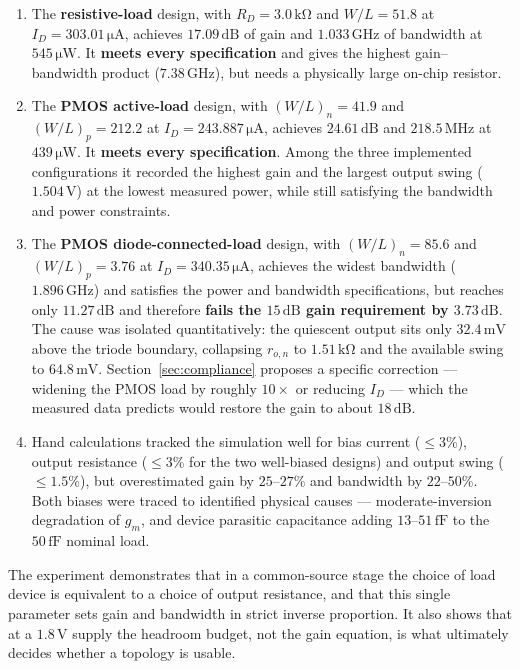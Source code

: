 \documentclass[12pt,a4paper]{article}
\newcommand{\U}[1]{\,\mathrm{#1}}
\begin{document}
\begin{enumerate}[leftmargin=2.2em,itemsep=3pt]

\item The \textbf{resistive-load} design, with $R_D = 3.0\U{k\Omega}$ and
$W/L = 51.8$ at $I_D=303.01\U{\mu A}$, achieves $17.09\U{dB}$ of gain and
$1.033\U{GHz}$ of bandwidth at $545\U{\mu W}$. It \textbf{meets every
specification} and gives the highest gain--bandwidth product
($7.38\U{GHz}$), but needs a physically large on-chip resistor.

\item The \textbf{PMOS active-load} design, with $(W/L)_n = 41.9$ and
$(W/L)_p = 212.2$ at $I_D = 243.887\U{\mu A}$, achieves $24.61\U{dB}$ and
$218.5\U{MHz}$ at $439\U{\mu W}$. It \textbf{meets every specification}. Among
the three implemented configurations it recorded the highest gain and the
largest output swing ($1.504\U{V}$) at the lowest measured power, while still
satisfying the bandwidth and power constraints.

\item The \textbf{PMOS diode-connected-load} design, with $(W/L)_n = 85.6$ and
$(W/L)_p = 3.76$ at $I_D=340.35\U{\mu A}$, achieves the widest bandwidth
($1.896\U{GHz}$) and satisfies the power and bandwidth specifications, but
reaches only $11.27\U{dB}$ and therefore \textbf{fails the $15\U{dB}$ gain
requirement by $3.73\U{dB}$}. The cause was isolated quantitatively: the
quiescent output sits only $32.4\U{mV}$ above the triode boundary, collapsing
$r_{o,n}$ to $1.51\U{k\Omega}$ and the available swing to $64.8\U{mV}$.
Section~\ref{sec:compliance} proposes a specific correction --- widening the
PMOS load by roughly $10\times$ or reducing $I_D$ --- which the measured data
predicts would restore the gain to about $18\U{dB}$.

\item Hand calculations tracked the simulation well for bias current
($\leq 3\%$), output resistance ($\leq 3\%$ for the two well-biased designs)
and output swing ($\leq 1.5\%$), but overestimated gain by $25$--$27\%$ and
bandwidth by $22$--$50\%$. Both biases were traced to identified physical
causes --- moderate-inversion degradation of $g_m$, and device parasitic
capacitance adding $13$--$51\U{fF}$ to the $50\U{fF}$ nominal load.

\end{enumerate}

The experiment demonstrates that in a common-source stage the choice of load
device is equivalent to a choice of output resistance, and that this single
parameter sets gain and bandwidth in strict inverse proportion. It also shows
that at a $1.8\U{V}$ supply the headroom budget, not the gain equation, is
what ultimately decides whether a topology is usable.
\end{document}
